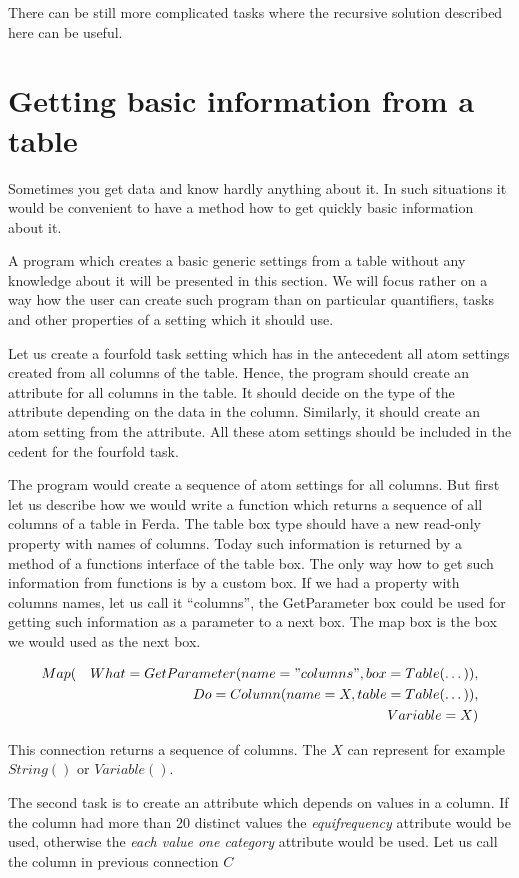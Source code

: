 \documentclass[a4paper,12pt]{book}
\begin{document}
There can be still more complicated tasks where the recursive solution described here can be useful.

\section{Getting basic information from a table}
Sometimes you get data and know hardly anything about it. In such situations it would be convenient to have a method how to get quickly basic information about it.

A program which creates a basic generic settings from a table without any knowledge about it will be presented in this section. We will focus rather on a way how the user can create such program than on particular quantifiers, tasks and other properties of a setting which it should use.

Let us create a fourfold task setting which has in the antecedent all atom settings created from all columns of the table. Hence, the program should create an attribute for all columns in the table. It should decide on the type of the attribute depending on the data in the column. Similarly, it should create an atom setting from the attribute. All these atom settings should be included in the cedent for the fourfold task.

The program would create a sequence of atom settings for all columns. But first let us describe how we would write a function which returns a sequence of all columns of a table in Ferda. The table box type should have a new read-only property with names of columns. Today such information is returned by a method of a functions interface of the table box. The only way how to get such information from functions is by a custom box. If we had a property with columns names, let us call it ``columns'', the GetParameter box could be used for getting such information as a parameter to a next box. The map box is the box we would used as the next box.

\begin{eqnarray*}
Map(&&What=GetParameter(name="columns", box=Table(\dots)), \\&& Do=Column(name=X, table=Table(\dots)), \\&& Variable=X)
\end{eqnarray*}

This connection returns a sequence of columns. The $X$ can represent for example $String()$ or $Variable()$.

The second task is to create an attribute which depends on values in a column. If the column had more than 20 distinct values the \emph{equifrequency} attribute would be used, otherwise the \emph{each value one category} attribute would be used. Let us call the column in previous connection $C$
\end{document}

